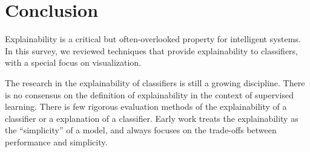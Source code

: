 \chapter{Conclusion}\label{sec-conclusion}

Explainability is a critical but often-overlooked property for intelligent systems. In this survey, we reviewed techniques that provide explainability to classifiers, with a special focus on visualization. 

The research in the explainability of classifiers is still a growing discipline. There is no consensus on the definition of explainability in the context of supervised learning. There is few rigorous evaluation methods of the explainability of a classifier or a explanation of a classifier. Early work treats the explainability as the ``simplicity'' of a model, and always focuses on the trade-offs between performance and simplicity. 


